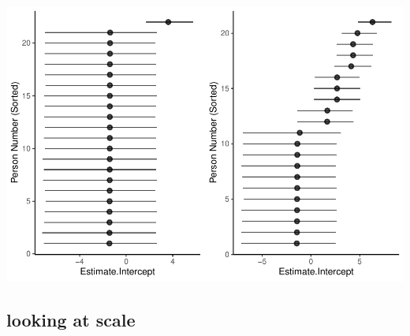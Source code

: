 \documentclass[
  man]{apa7}
\begin{document}
\includegraphics{resp_opts_manus23022_files/figure-latex/unnamed-chunk-8-1.pdf}

\hypertarget{looking-at-scale}{%
\subsection{looking at scale}\label{looking-at-scale}}
\end{document}
